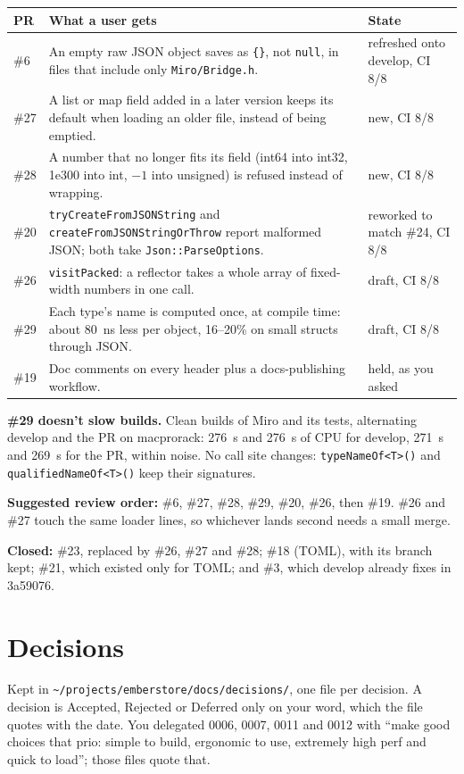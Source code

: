 \documentclass[11pt,a4paper]{article}
\newcommand{\code}[1]{\texttt{#1}}
\begin{document}
\begin{tabularx}{\textwidth}{@{}l X l@{}}
\toprule
PR & What a user gets & State \\
\midrule
\#6 & An empty raw JSON object saves as \code{\{\}}, not \code{null}, in files that include only \code{Miro/Bridge.h}. & refreshed onto develop, CI 8/8 \\
\#27 & A list or map field added in a later version keeps its default when loading an older file, instead of being emptied. & new, CI 8/8 \\
\#28 & A number that no longer fits its field (int64 into int32, 1e300 into int, $-1$ into unsigned) is refused instead of wrapping. & new, CI 8/8 \\
\#20 & \code{tryCreateFromJSONString} and \code{createFromJSONStringOrThrow} report malformed JSON; both take \code{Json::ParseOptions}. & reworked to match \#24, CI 8/8 \\
\#26 & \code{visitPacked}: a reflector takes a whole array of fixed-width numbers in one call. & draft, CI 8/8 \\
\#29 & Each type's name is computed once, at compile time: about 80~ns less per object, 16--20\% on small structs through JSON. & draft, CI 8/8 \\
\#19 & Doc comments on every header plus a docs-publishing workflow. & held, as you asked \\
\bottomrule
\end{tabularx}

\textbf{\#29 doesn't slow builds.} Clean builds of Miro and its tests, alternating develop and the PR on macprorack: 276~s and 276~s of CPU for develop, 271~s and 269~s for the PR, within noise. No call site changes: \code{typeNameOf<T>()} and \code{qualifiedNameOf<T>()} keep their signatures.

\textbf{Suggested review order:} \#6, \#27, \#28, \#29, \#20, \#26, then \#19. \#26 and \#27 touch the same loader lines, so whichever lands second needs a small merge.

\textbf{Closed:} \#23, replaced by \#26, \#27 and \#28; \#18 (TOML), with its branch kept; \#21, which existed only for TOML; and \#3, which develop already fixes in 3a59076.

\section{Decisions}

Kept in \code{\textasciitilde/projects/emberstore/docs/decisions/}, one file per decision. A decision is Accepted, Rejected or Deferred only on your word, which the file quotes with the date. You delegated 0006, 0007, 0011 and 0012 with ``make good choices that prio: simple to build, ergonomic to use, extremely high perf and quick to load''; those files quote that.
\end{document}
